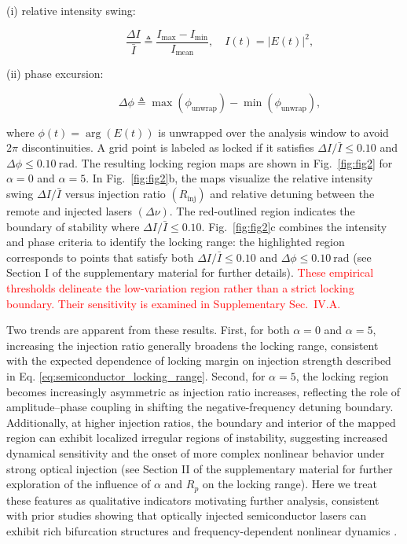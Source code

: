 \documentclass[%
 aip,
 apl,
 amsmath,amssymb,
 reprint,%
 floatfix,
]{revtex4-1}
\begin{document}
\begin{description}
    \item[(i) relative intensity swing:]
    \begin{equation}
    \frac{\Delta I}{\bar I} \triangleq \frac{I_{\max}-I_{\min}}{I_{\mathrm{mean}}},
    \quad I(t)=|E(t)|^2,
    \label{eq:dI}
    \end{equation}

    \item[(ii) phase excursion:]
    \begin{equation}
    \Delta\phi \triangleq \max(\phi_{\mathrm{unwrap}})-\min(\phi_{\mathrm{unwrap}}),
    \label{eq:dphi}
    \end{equation}
\end{description}
where $\phi(t)=\arg(E(t))$ is unwrapped over the analysis window to avoid $2\pi$ discontinuities. A grid point is labeled as locked if it satisfies $\Delta I/\bar I \le 0.10$ and $\Delta\phi \le 0.10~\mathrm{rad}$. The resulting locking region maps are shown in Fig.~\ref{fig:fig2} for $\alpha=0$ and $\alpha=5$. In Fig.~\ref{fig:fig2}b, the maps visualize the relative intensity swing $\Delta I/\bar{I}$ versus injection ratio $(R_{\mathrm{inj}})$ and relative detuning between the remote and injected lasers $(\Delta\nu)$. The red-outlined region indicates the boundary of stability where $\Delta I/\bar{I}\le 0.10$. Fig.~\ref{fig:fig2}c combines the intensity and phase criteria to identify the locking range: the highlighted region corresponds to points that satisfy both $\Delta I/\bar{I}\le 0.10$ and $\Delta\phi\le 0.10~\mathrm{rad}$ (see Section I of the supplementary material for further details).
\textcolor{red}{These empirical thresholds delineate the low-variation region rather than a strict locking boundary. Their sensitivity is examined in Supplementary Sec.~IV.A.}

Two trends are apparent from these results. First, for both $\alpha=0$ and $\alpha=5$, increasing the injection ratio generally broadens the locking range, consistent with the expected dependence of locking margin on injection strength described in Eq. \eqref{eq:semiconductor_locking_range}. Second, for $\alpha=5$, the locking region becomes increasingly asymmetric as injection ratio increases, reflecting the role of amplitude--phase coupling in shifting the negative-frequency detuning boundary. Additionally, at higher injection ratios, the boundary and interior of the mapped region can exhibit localized irregular regions of instability, suggesting increased dynamical sensitivity and the onset of more complex nonlinear behavior under strong optical injection (see Section II of the supplementary material for further exploration of the influence of $\alpha$ and $R_p$ on the locking range). Here we treat these features as qualitative indicators motivating further analysis, consistent with prior studies showing that optically injected semiconductor lasers can exhibit rich bifurcation structures and frequency-dependent nonlinear dynamics \cite{WieczorekKrauskopfLenstra1999Bifurcations,Mogensen1985JQE_LockingStability_SemiconductorInjection,Lau2008JQE_FreqRespEnh_OIL, LIN14,Pausch2012NJP_QDInjectionDynamics}.
\end{document}

